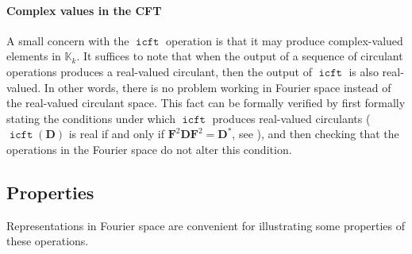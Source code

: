 \documentclass[1p,authoryear,letterpaper]{elsarticle}
\providecommand{\KK}{\mathbb{K}}
\providecommand{\mat}{\boldsymbol}
\providecommand{\mD}{\ensuremath{\mat{D}}}
\providecommand{\mF}{\ensuremath{\mat{F}}}
\DeclareMathOperator{\ifft}{\texttt{icft}}
\DeclareMathOperator{\icft}{\texttt{icft}}
\begin{document}
\paragraph{Complex values in the CFT}

A small concern with the $\ifft$ operation is that it may produce
complex-valued elements in $\KK_k$.
It suffices to note that when the output of a sequence of
circulant operations produces a real-valued circulant,
then the output of $\ifft$ is also real-valued.  In other
words, there is no problem working in Fourier space instead
of the real-valued circulant space.  This
fact can be formally verified by first formally stating the conditions
under which $\ifft$ produces real-valued circulants
($\icft(\mD)$ is real if and only if $\mF^2 \mD \mF^2 = \mD^*$,
see \citet{davis1979-circulant}),
and then
checking that the operations in the Fourier space do not
alter this condition.


\subsection{Properties}
Representations in Fourier space are convenient for illustrating
some properties of these operations. 
\end{document}
